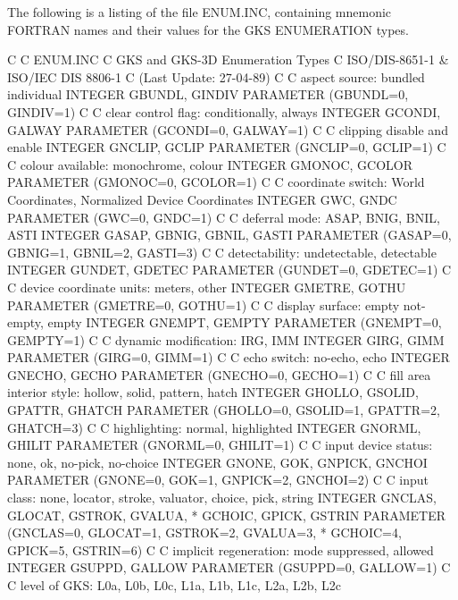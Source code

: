 The following is a listing of the file ENUM.INC, containing
mnemonic FORTRAN names and their values for the GKS ENUMERATION types.
\begin{XMP}
C
C     ENUM.INC
C     GKS and GKS-3D Enumeration Types
C     ISO/DIS-8651-1 & ISO/IEC DIS 8806-1
C     (Last Update: 27-04-89)
C
C  aspect source:  bundled  individual
      INTEGER     GBUNDL,    GINDIV
      PARAMETER  (GBUNDL=0,  GINDIV=1)
C
C clear control flag:  conditionally, always
      INTEGER     GCONDI,    GALWAY
      PARAMETER  (GCONDI=0,  GALWAY=1)
C
C clipping disable and enable
      INTEGER     GNCLIP,    GCLIP
      PARAMETER  (GNCLIP=0,  GCLIP=1)
C
C colour available:  monochrome, colour
      INTEGER     GMONOC,    GCOLOR
      PARAMETER  (GMONOC=0,  GCOLOR=1)
C
C coordinate switch:  World Coordinates, Normalized Device Coordinates
      INTEGER     GWC,       GNDC
      PARAMETER  (GWC=0,     GNDC=1)
C
C deferral mode:   ASAP,      BNIG,       BNIL,      ASTI
      INTEGER     GASAP,     GBNIG,      GBNIL,     GASTI
      PARAMETER  (GASAP=0,   GBNIG=1,    GBNIL=2,   GASTI=3)
C
C detectability:   undetectable, detectable
      INTEGER     GUNDET,    GDETEC
      PARAMETER  (GUNDET=0,  GDETEC=1)
C
C device coordinate units: meters,  other
      INTEGER     GMETRE,    GOTHU
      PARAMETER  (GMETRE=0,  GOTHU=1)
C
C display surface: empty  not-empty,  empty
      INTEGER     GNEMPT,    GEMPTY
      PARAMETER  (GNEMPT=0,  GEMPTY=1)
C
C dynamic modification: IRG,      IMM
      INTEGER     GIRG,      GIMM
      PARAMETER  (GIRG=0,    GIMM=1)
C
C echo switch:   no-echo, echo
      INTEGER     GNECHO,    GECHO
      PARAMETER  (GNECHO=0,  GECHO=1)
C
C fill area interior style:  hollow, solid, pattern, hatch
      INTEGER     GHOLLO,    GSOLID,    GPATTR,    GHATCH
      PARAMETER  (GHOLLO=0,  GSOLID=1,  GPATTR=2,  GHATCH=3)
C
C highlighting:   normal,  highlighted
      INTEGER     GNORML,    GHILIT
      PARAMETER  (GNORML=0,  GHILIT=1)
C
C input device status:   none,  ok,  no-pick,  no-choice
      INTEGER     GNONE,     GOK,       GNPICK,    GNCHOI
      PARAMETER  (GNONE=0,   GOK=1,     GNPICK=2,  GNCHOI=2)
C
C input class: none, locator, stroke, valuator, choice, pick, string
      INTEGER     GNCLAS,    GLOCAT,    GSTROK,    GVALUA,
     *            GCHOIC,    GPICK,     GSTRIN
      PARAMETER  (GNCLAS=0,  GLOCAT=1,  GSTROK=2,  GVALUA=3,
     *            GCHOIC=4,  GPICK=5, GSTRIN=6)
C
C implicit regeneration: mode suppressed, allowed
      INTEGER      GSUPPD,    GALLOW
      PARAMETER   (GSUPPD=0,  GALLOW=1)
C
C level of GKS:   L0a,  L0b,  L0c,  L1a,  L1b,  L1c,  L2a,  L2b,  L2c

\end{XMP}
